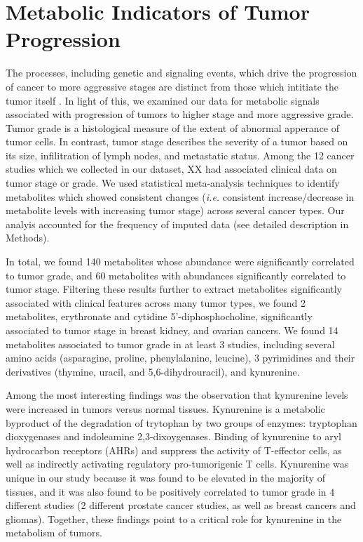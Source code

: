 \documentclass[10pt]{article}
\begin{document}
\section{Metabolic Indicators of Tumor Progression}
The processes, including genetic and signaling events, which drive the progression of cancer to more aggressive stages are distinct from those which intitiate the tumor itself \cite{CITE}. In light of this, we examined our data for metabolic signals associated with progression of tumors to higher stage and more aggressive grade. Tumor grade is a histological measure of the extent of abnormal apperance of tumor cells. In contrast, tumor stage describes the severity of a tumor based on its size, infilitration of lymph nodes, and metastatic status. Among the 12 cancer studies which we collected in our dataset, XX had associated clinical data on tumor stage or grade. We used statistical meta-analysis techniques to identify metabolites which showed consistent changes (\textit{i.e.} consistent increase/decrease in metabolite levels with increasing tumor stage) across several cancer types. Our analyis accounted for the frequency of imputed data (see detailed description in Methods).

In total, we found 140 metabolites whose abundance were significantly correlated to tumor grade, and 60 metabolites with abundances significantly correlated to tumor stage. Filtering these results further to extract metabolites significantly associated with clinical features across many tumor types, we found 2 metabolites, erythronate and cytidine 5'-diphosphocholine, significantly associated to tumor stage in breast kidney, and ovarian cancers. We found 14 metabolites associated to tumor grade in at least 3 studies, including several amino acids (asparagine, proline, phenylalanine, leucine), 3 pyrimidines and their derivatives (thymine, uracil, and 5,6-dihydrouracil), and kynurenine. 

Among the most interesting findings was the observation that kynurenine levels were increased in tumors versus normal tissues. Kynurenine is a metabolic byproduct of the degradation of trytophan by two groups of enzymes: tryptophan dioxygenases and indoleamine 2,3-dixoygenases. Binding of kynurenine to aryl hydrocarbon receptors (AHRs) and suppress the activity of T-effector cells, as well as indirectly activating regulatory pro-tumorigenic T cells. Kynurenine was unique in our study because it was found to be elevated in the majority of tissues, and it was also found to be positively correlated to tumor grade in 4 different studies (2 different prostate cancer studies, as well as breast cancers and gliomas). Together, these findings point to a critical role for kynurenine in the metabolism of tumors.
\end{document}
